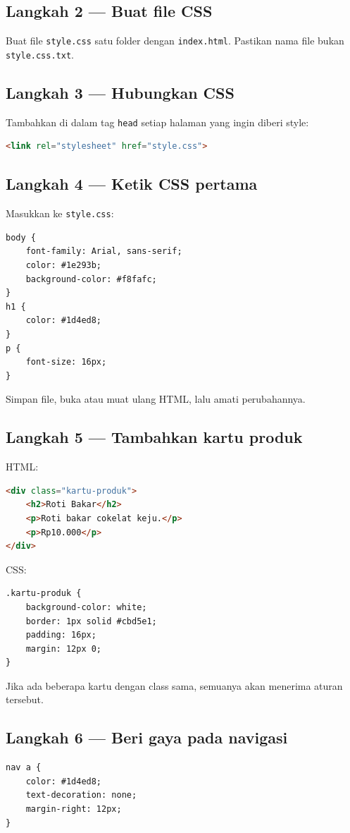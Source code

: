 \documentclass[11pt,a4paper]{article}
\begin{document}
\subsection{Langkah 2 --- Buat file CSS}
Buat file \texttt{style.css} satu folder dengan \texttt{index.html}. Pastikan nama file bukan \texttt{style.css.txt}.

\subsection{Langkah 3 --- Hubungkan CSS}
Tambahkan di dalam tag \texttt{head} setiap halaman yang ingin diberi style:
\begin{lstlisting}[language=HTML]
<link rel="stylesheet" href="style.css">
\end{lstlisting}

\subsection{Langkah 4 --- Ketik CSS pertama}
Masukkan ke \texttt{style.css}:
\begin{lstlisting}
body {
    font-family: Arial, sans-serif;
    color: #1e293b;
    background-color: #f8fafc;
}
h1 {
    color: #1d4ed8;
}
p {
    font-size: 16px;
}
\end{lstlisting}
Simpan file, buka atau muat ulang HTML, lalu amati perubahannya.

\subsection{Langkah 5 --- Tambahkan kartu produk}
HTML:
\begin{lstlisting}[language=HTML]
<div class="kartu-produk">
    <h2>Roti Bakar</h2>
    <p>Roti bakar cokelat keju.</p>
    <p>Rp10.000</p>
</div>
\end{lstlisting}
CSS:
\begin{lstlisting}
.kartu-produk {
    background-color: white;
    border: 1px solid #cbd5e1;
    padding: 16px;
    margin: 12px 0;
}
\end{lstlisting}
Jika ada beberapa kartu dengan class sama, semuanya akan menerima aturan tersebut.

\subsection{Langkah 6 --- Beri gaya pada navigasi}
\begin{lstlisting}
nav a {
    color: #1d4ed8;
    text-decoration: none;
    margin-right: 12px;
}
\end{lstlisting}
\end{document}
